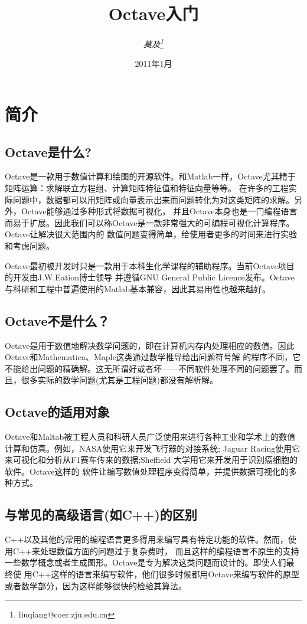 \documentclass[UTF8,adobefonts]{ctexart}
\begin{document}
\title{Octave入门}
\author{\it 莫及\footnote{liuqiang@coer.zju.edu.cn}}
\date{2011年1月}
\maketitle
\tableofcontents
\newpage
\section{简介}
\subsection{Octave是什么?}
Octave是一款用于数值计算和绘图的开源软件。和Matlab一样，Octave尤其精于矩阵运算：求解联立方程组、计算矩阵特征值和特征向量等等。
在许多的工程实际问题中，数据都可以用矩阵或向量表示出来而问题转化为对这类矩阵的求解。另外，Octave能够通过多种形式将数据可视化，
并且Octave本身也是一门编程语言而易于扩展。因此我们可以称Octave是一款非常强大的可编程可视化计算程序。Octave让解决很大范围内的
数值问题变得简单，给使用者更多的时间来进行实验和考虑问题。

Octave最初被开发时只是一款用于本科生化学课程的辅助程序。当前Octave项目的开发由J.W.Eation博士领导
并遵循GNU General Public Licence发布。Octave与科研和工程中普遍使用的Matlab基本兼容，因此其易用性也越来越好。
\subsection{Octave不是什么？}
Octave是用于数值地解决数学问题的，即在计算机内存内处理相应的数值。因此Octave和Mathematica、Maple这类通过数学推导给出问题符号解
的程序不同，它不能给出问题的精确解。这无所谓好或者坏——不同软件处理不同的问题罢了。而且，很多实际的数学问题(尤其是工程问题)都没有解析解。
\subsection{Octave的适用对象}
Octave和Maltab被工程人员和科研人员广泛使用来进行各种工业和学术上的数值计算和仿真。例如，NASA使用它来开发飞行器的对接系统;
Jaguar Racing使用它来可视化和分析从F1赛车传来的数据;Sheffield 大学用它来开发用于识别癌细胞的软件。Octave这样的
软件让编写数值处理程序变得简单，并提供数据可视化的多种方式。
\subsection{与常见的高级语言(如C++)的区别}
C++以及其他的常用的编程语言更多得用来编写具有特定功能的软件。然而，使用C++来处理数值方面的问题过于复杂费时，
而且这样的编程语言不原生的支持一些数学概念或者生成图形。Octave是专为解决这类问题而设计的。即使人们最终使
用C++这样的语言来编写软件，他们很多时候都用Octave来编写软件的原型或者数学部分，因为这样能够很快的检验其算法。
\end{document}
